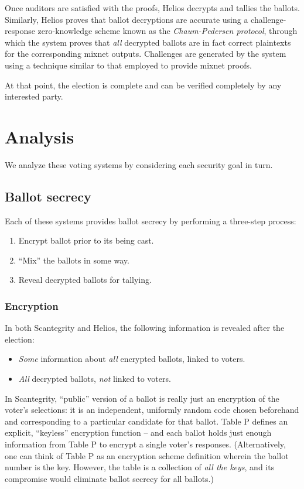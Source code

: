 \documentclass[10pt,twocolumn]{article}
\newcommand{\term}[1]{\textit{#1}}
\begin{document}
Once auditors are satisfied with the proofs, Helios decrypts and tallies the ballots. Similarly,
Helios proves that ballot decryptions are accurate using a challenge-response zero-knowledge scheme
known as the \term{Chaum-Pedersen protocol}, through which the system proves that \emph{all}
decrypted ballots are in fact correct plaintexts for the corresponding mixnet outputs. Challenges
are generated by the system using a technique similar to that employed to provide mixnet proofs.

At that point, the election is complete and can be verified completely by any interested party.

\section{Analysis}

We analyze these voting systems by considering each security goal in turn.

\subsection{Ballot secrecy}

Each of these systems provides ballot secrecy by performing a three-step process:
\begin{enumerate}
	\item
		Encrypt ballot prior to its being cast.
	\item
		``Mix'' the ballots in some way.
	\item
		Reveal decrypted ballots for tallying.
\end{enumerate}

\subsubsection{Encryption}

In both Scantegrity and Helios, the following information is revealed after the election:
\begin{itemize}
	\item
		\emph{Some} information about \emph{all} encrypted ballots, linked to voters.
	\item
		\emph{All} decrypted ballots, \emph{not} linked to voters.
\end{itemize}

In Scantegrity, ``public'' version of a ballot is really just an encryption of the voter's
selections: it is an independent, uniformly random code chosen beforehand and corresponding to a
particular candidate for that ballot. Table P defines an explicit, ``keyless'' encryption
function -- and each ballot holds just enough information from Table P to encrypt a single voter's
responses. (Alternatively, one can think of Table P as an encryption scheme definition wherein the
ballot number is the key. However, the table is a collection of \emph{all the keys}, and its
compromise would eliminate ballot secrecy for all ballots.)
\end{document}
